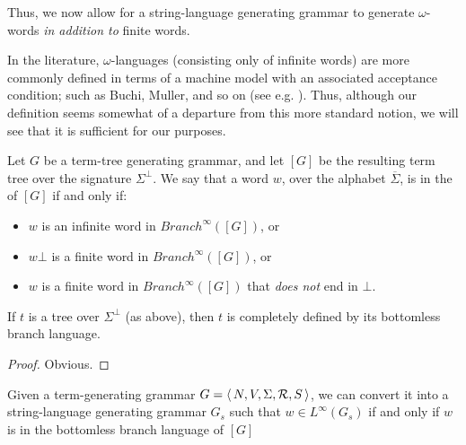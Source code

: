 \begin{remark}Thus, we now allow for a string-language generating
grammar to generate $\omega$-words \emph{in addition to} finite
words.

In the literature, $\omega$-languages (consisting only of
infinite words) are more commonly defined in terms of a machine
model with an associated acceptance condition; such as Buchi,
Muller, and so on (see e.g. \cite{GTW02}). Thus, although our definition
seems somewhat of a departure from this more standard notion, we
will see that it is sufficient for our purposes.
\end{remark}


\begin{definition} Let $G$ be a term-tree generating grammar, and let
$[G]$ be the resulting term tree over the signature $\Sigma^\bot$.
We say that a word $w$, over the alphabet $\overline{\Sigma}$, is
in the  of $[G]$ if and only
if:
\begin{itemize}\item $w$ is an infinite word in $Branch^\infty([G])$,
or \item $w\bot$ is a finite word in $Branch^\infty([G])$, or
\item $w$ is a finite word in $Branch^\infty([G])$ that \emph{does
not} end in $\bot$.
\end{itemize}
\end{definition}

\begin{lemma} If $t$ is a tree over $\Sigma^\bot$ (as above),
then $t$ is completely defined by its bottomless branch language.
\end{lemma}

\begin{proof} Obvious.
\end{proof}

\begin{lemma}\label{lem:ts} Given a term-generating grammar $G = \langle\,{N,
V, \Sigma, {\cal R}, S}\,\rangle$, we can convert it into a string-language
generating grammar $G_s$ such that $w \in {L^\infty}(G_s)$ if and
only if $w$ is in the bottomless branch language of $[G]$
\end{lemma}

